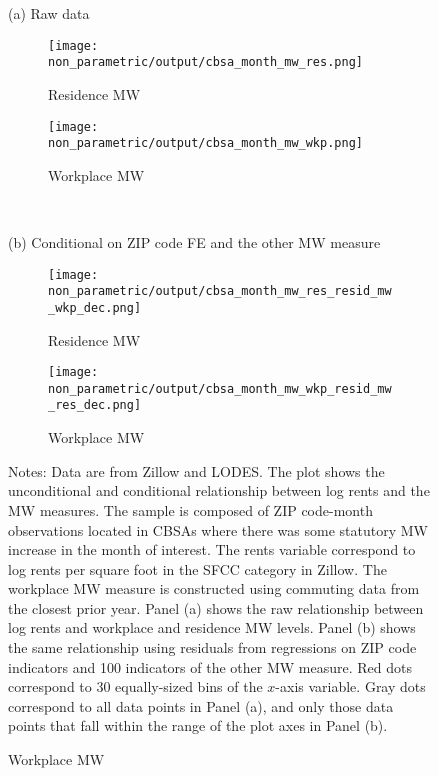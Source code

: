 \begin{figure}[h!]
    \centering
    \caption{Relationship between log rents and the minimum wage measures, 
             sample of affected ZIP code-months}
    \label{fig:non_parametric}
    
    \begin{minipage}{.95\textwidth} \centering
        (a) Raw data
        \vspace{1mm}
    \end{minipage}
    \begin{subfigure}{0.49\textwidth}
        \caption*{Residence MW}
        \texttt{[image: non\_parametric/output/cbsa\_month\_mw\_res.png]}
    \end{subfigure}%
    \begin{subfigure}{0.49\textwidth}
        \caption*{Workplace MW}
        \texttt{[image: non\_parametric/output/cbsa\_month\_mw\_wkp.png]}
    \end{subfigure}\\

    \vspace{2mm}
    \begin{minipage}{.95\textwidth} \centering
        (b) Conditional on ZIP code FE and the other MW measure
        \vspace{1mm}
    \end{minipage}
    \begin{subfigure}{0.49\textwidth}
        \caption*{Residence MW}
        \texttt{[image: non\_parametric/output/cbsa\_month\_mw\_res\_resid\_mw\_wkp\_dec.png]}
    \end{subfigure}%
    \begin{subfigure}{0.49\textwidth}
        \caption*{Workplace MW}
        \texttt{[image: non\_parametric/output/cbsa\_month\_mw\_wkp\_resid\_mw\_res\_dec.png]}
    \end{subfigure}

    \begin{minipage}{.95\textwidth} \footnotesize
        \vspace{3mm}
        Notes:
        Data are from Zillow and LODES.
        The plot shows the unconditional and conditional relationship between 
        log rents and the MW measures.
        The sample is composed of ZIP code-month observations located in CBSAs 
        where there was some statutory MW increase in the month of interest. 
        The rents variable correspond to log rents per square foot in the SFCC 
        category in Zillow.
        The workplace MW measure is constructed using commuting data from the 
        closest prior year.
        Panel (a) shows the raw relationship between log rents and workplace 
        and residence MW levels.
        Panel (b) shows the same relationship using residuals from regressions 
        on ZIP code indicators and 100 indicators of the other MW measure.
        Red dots correspond to 30 equally-sized bins of the $x$-axis variable.
        Gray dots correspond to all data points in Panel (a), and only those 
        data points that fall within the range of the plot axes in Panel (b).
    \end{minipage}
\end{figure}